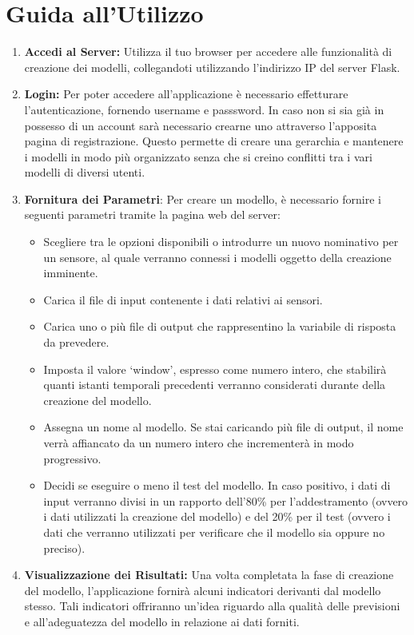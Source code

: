 \documentclass[a4paper,10pt]{article}
\begin{document}
\section{Guida all'Utilizzo}
\begin{enumerate}
  \item \textbf{Accedi al Server:} Utilizza il tuo browser per accedere alle funzionalità di creazione dei modelli, 
  collegandoti utilizzando l'indirizzo IP del server Flask.

  \item \textbf{Login:} Per poter accedere all'applicazione è necessario effetturare l'autenticazione, fornendo username e passsword. In caso non si sia già in possesso
  di un account sarà necessario crearne uno attraverso l'apposita pagina di registrazione. Questo permette di creare una gerarchia e mantenere i modelli 
  in modo più organizzato senza che si creino conflitti tra i vari modelli di diversi utenti.

  \item \textbf{Fornitura dei Parametri}: Per creare un modello, è necessario fornire i seguenti parametri tramite la pagina web del server:
  \begin{itemize}
    \item Scegliere tra le opzioni disponibili o introdurre un nuovo nominativo per un sensore, al quale verranno connessi i modelli oggetto della creazione imminente.
    \item Carica il file di input contenente i dati relativi ai sensori.
    \item Carica uno o più file di output che rappresentino la variabile di risposta da prevedere.
    \item Imposta il valore `window', espresso come numero intero, che stabilirà quanti istanti temporali precedenti verranno considerati durante della creazione del modello.
    \item Assegna un nome al modello. Se stai caricando più file di output, il nome verrà affiancato da un numero intero che incrementerà in modo progressivo.
    \item Decidi se eseguire o meno il test del modello. In caso positivo, i dati di input verranno divisi in un rapporto dell'80\% per l'addestramento 
    (ovvero i dati utilizzati la creazione del modello) e del 20\% per il test (ovvero i dati che verranno utilizzati per verificare che il modello sia oppure no preciso).
  \end{itemize}
  
  \item \textbf{Visualizzazione dei Risultati:} Una volta completata la fase di creazione del modello, l'applicazione fornirà alcuni indicatori derivanti dal modello stesso. 
  Tali indicatori offriranno un'idea riguardo alla qualità delle previsioni e all'adeguatezza del modello in relazione ai dati forniti.


\end{enumerate}
\end{document}
